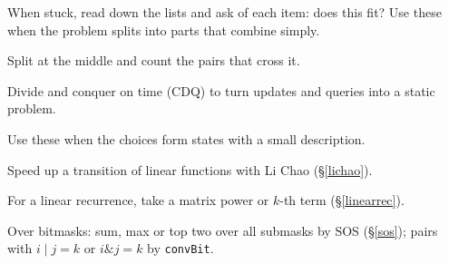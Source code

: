 {\footnotesize\tightdisplay
When stuck, read down the lists and ask of each item: does this fit?
Use these when the problem splits into parts that combine simply.
\begin{checks}
	\item Split at the middle and count the pairs that cross it.
	\item Divide and conquer on time (CDQ) to turn updates and queries into a static problem.
\end{checks}
Use these when the choices form states with a small description.
\begin{checks}
	\item Speed up a transition of linear functions with Li Chao (\S\ref{lichao}).
	\item For a linear recurrence, take a matrix power or $k$-th term (\S\ref{linearrec}).
	\item Over bitmasks: sum, max or top two over all submasks by SOS (\S\ref{sos}); pairs with $i \mathbin{|} j = k$ or $i \mathbin{\&} j = k$ by \texttt{convBit}.
\end{checks}
}
